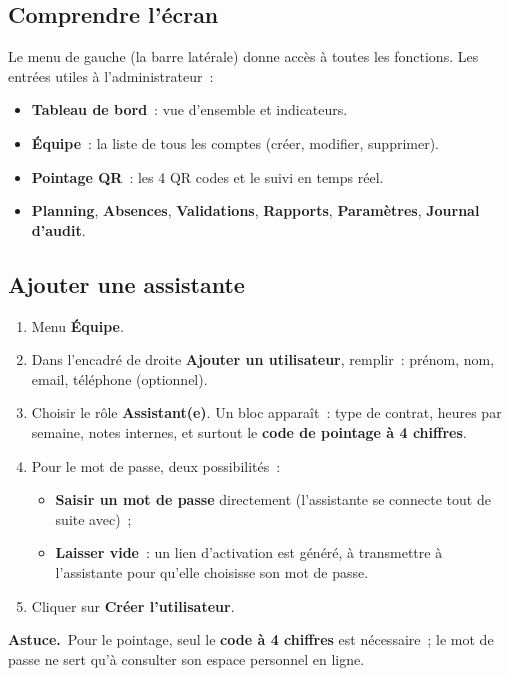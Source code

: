 \documentclass[11pt,a4paper]{article}
\newcommand{\encadre}[2]{%
  \par\smallskip\noindent
  \colorbox{#1}{\parbox{\dimexpr\linewidth-2\fboxsep}{\smallskip #2\smallskip}}%
  \par\smallskip}
\newcommand{\astuce}[1]{\encadre{faradaylight}{\textbf{\textcolor{faraday}{Astuce.}}~#1}}
\newcommand{\menu}[1]{\textbf{\textcolor{faraday}{#1}}}
\begin{document}
\subsection{Comprendre l'écran}
Le menu de gauche (la barre latérale) donne accès à toutes les fonctions. Les entrées utiles à l'administrateur~:
\begin{itemize}[leftmargin=1.4em]
  \item \menu{Tableau de bord}~: vue d'ensemble et indicateurs.
  \item \menu{Équipe}~: la liste de tous les comptes (créer, modifier, supprimer).
  \item \menu{Pointage QR}~: les 4 QR codes et le suivi en temps réel.
  \item \menu{Planning}, \menu{Absences}, \menu{Validations}, \menu{Rapports}, \menu{Paramètres}, \menu{Journal d'audit}.
\end{itemize}

\subsection{Ajouter une assistante}
\begin{enumerate}[leftmargin=1.6em]
  \item Menu \menu{Équipe}.
  \item Dans l'encadré de droite \menu{Ajouter un utilisateur}, remplir~: prénom, nom, email, téléphone (optionnel).
  \item Choisir le rôle \menu{Assistant(e)}. Un bloc apparaît~: type de contrat, heures par semaine, notes internes, et surtout le \textbf{code de pointage à 4 chiffres}.
  \item Pour le mot de passe, deux possibilités~:
    \begin{itemize}[leftmargin=1.2em]
      \item \textbf{Saisir un mot de passe} directement (l'assistante se connecte tout de suite avec)~;
      \item \textbf{Laisser vide}~: un lien d'activation est généré, à transmettre à l'assistante pour qu'elle choisisse son mot de passe.
    \end{itemize}
  \item Cliquer sur \menu{Créer l'utilisateur}.
\end{enumerate}

\astuce{Pour le pointage, seul le \textbf{code à 4 chiffres} est nécessaire~; le mot de passe ne sert qu'à consulter son espace personnel en ligne.}
\end{document}
